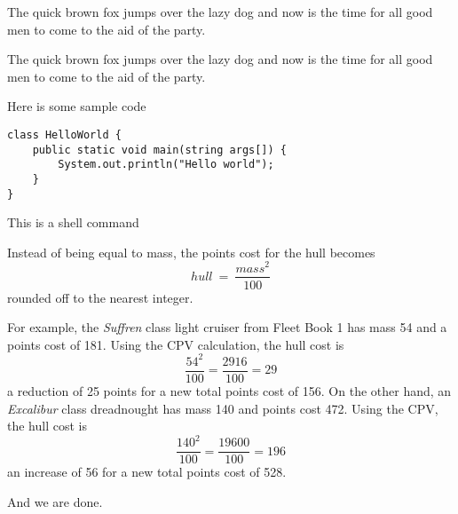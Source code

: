 









\DOT The quick brown fox jumps over the lazy dog and now is the time for all good men to come
to the aid of the party.


\begin{IMPORTANT}
The quick brown fox jumps over the lazy dog and now is the time for all good men to come
to the aid of the party.
\end{IMPORTANT}

Here is some sample code

\begin{CODE}\begin{verbatim}
class HelloWorld {
    public static void main(string args[]) {
        System.out.println("Hello world");
    }
}
\end{verbatim}\end{CODE}

This is a shell command



Instead of being equal to mass, the points cost for the hull becomes
\[ hull\ =\ \frac{mass^{2}} {100} \]
rounded off to the nearest integer.

For example, the \emph{Suffren} class light cruiser from Fleet Book 1
has mass 54 and a points cost of 181. Using the CPV calculation, the hull cost is
\[ \frac{54^{2}}{100} = \frac{2916}{100} = 29 \]
a reduction of 25 points for a new total points cost of 156. On the
other hand, an \emph{Excalibur} class dreadnought has mass 140 and points cost
472. Using the CPV, the hull cost is
\[ \frac{140^{2}}{100} = \frac{19600}{100} = 196 \]
an increase of 56 for a new total points
cost of 528.


And we are done.


